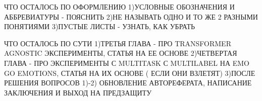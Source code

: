 ЧТО ОСТАЛОСЬ ПО ОФОРМЛЕНИЮ
1)УСЛОВНЫЕ ОБОЗНАЧЕНИЯ И АББРЕВИАТУРЫ - ПОЯСНИТЬ
2)НЕ НАЗЫВАТЬ ОДНО И ТО ЖЕ 2 РАЗНЫМИ ПОНЯТИЯМИ
3)ПУСТЫЕ ЛИСТЫ - УЗНАТЬ, КАК УБРАТЬ

ЧТО ОСТАЛОСЬ ПО СУТИ
1)ТРЕТЬЯ ГЛАВА - ПРО TRANSFORMER AGNOSTIC ЭКСПЕРИМЕНТЫ, СТАТЬЯ НА ЕЕ ОСНОВЕ
2)ЧЕТВЕРТАЯ ГЛАВА - ПРО ЭКСПЕРИМЕНТЫ С MULTITASK С MULTILABEL НА EMO GO EMOTIONS, СТАТЬЯ НА ИХ ОСНОВЕ ( ЕСЛИ ОНИ ВЗЛЕТЯТ)
3)ПОСЛЕ РЕШЕНИЯ ВОПРОСОВ 1)-2) ОБНОВЛЕНИЕ АВТОРЕФЕРАТА, НАПИСАНИЕ ЗАКЛЮЧЕНИЯ И ВЫХОД НА ПРЕДЗАЩИТУ